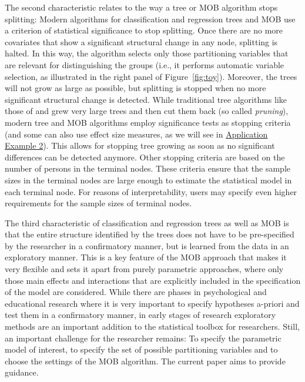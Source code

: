 \documentclass[doc,floatsintext,natbib]{apa7}
\begin{document}
The second characteristic relates to the way a tree or MOB algorithm stops splitting: Modern algorithms for classification and regression trees and MOB use a criterion of statistical significance to stop splitting. Once there are no more covariates that show a significant structural change in any node, splitting is halted. In this way, the  algorithm selects only those partitioning variables that are relevant for distinguishing the groups (i.e., it performs automatic variable selection, as illustrated in the right panel of Figure~\ref{fig:toy}). Moreover, the trees will not grow as large as possible, but splitting is stopped when no more significant structural change is detected. While traditional tree algorithms like those of \citet{Breetal:1984} and \citet{Qui:1993} grew very large trees and then cut them back (so called \textit{pruning}), modern tree and MOB algorithms employ significance tests as stopping criteria (and some can also use effect size measures, as we will see in \hyperref[sec:TutorialRasch]{Application Example 2}). This allows for stopping tree growing as soon as no significant differences can be detected anymore. Other stopping criteria are based on the number of persons in the terminal nodes. These criteria ensure that the sample sizes in the terminal nodes are large enough to estimate the statistical model in each terminal node. For reasons of interpretability, users may specify even higher requirements for the sample sizes of terminal nodes.

The third characteristic of classification and regression trees as well as MOB is that the entire structure identified by the trees does not have to be pre-specified by the researcher in a confirmatory manner, but is learned from the data in an exploratory manner. This is a key feature of the MOB approach that makes it very flexible and sets it apart from purely parametric approaches, where only those main effects and interactions that are explicitly included in the specification of the model are considered. While there are phases in psychological and educational research where it is very important to specify hypotheses a-priori and test them in a confirmatory manner, in early stages of research exploratory methods are an important addition to the statistical toolbox for researchers. Still, an important challenge for the researcher remains: To specify the parametric model of interest, to specify the set of possible partitioning variables and to choose the settings of the MOB algorithm. The current paper aims to provide guidance. 
\end{document}

